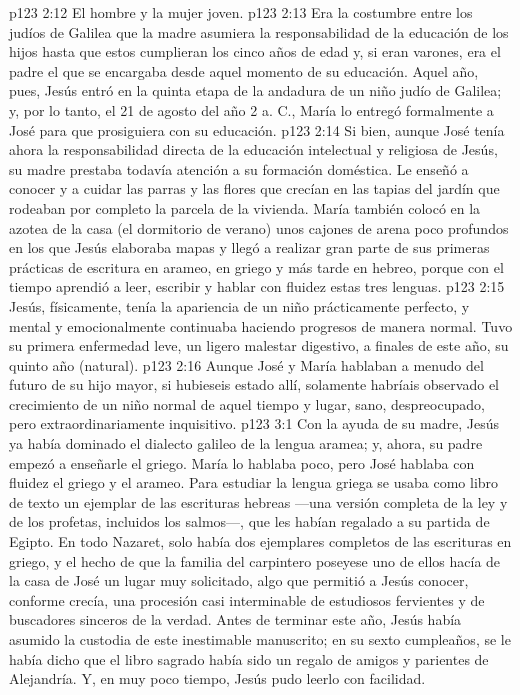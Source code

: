 \vs p123 2:12 El hombre y la mujer joven.
\vs p123 2:13 \pc Era la costumbre entre los judíos de Galilea que la madre asumiera la responsabilidad de la educación de los hijos hasta que estos cumplieran los cinco años de edad y, si eran varones, era el padre el que se encargaba desde aquel momento de su educación. Aquel año, pues, Jesús entró en la quinta etapa de la andadura de un niño judío de Galilea; y, por lo tanto, el 21 de agosto del año 2 a. C., María lo entregó formalmente a José para que prosiguiera con su educación.
\vs p123 2:14 Si bien, aunque José tenía ahora la responsabilidad directa de la educación intelectual y religiosa de Jesús, su madre prestaba todavía atención a su formación doméstica. Le enseñó a conocer y a cuidar las parras y las flores que crecían en las tapias del jardín que rodeaban por completo la parcela de la vivienda. María también colocó en la azotea de la casa (el dormitorio de verano) unos cajones de arena poco profundos en los que Jesús elaboraba mapas y llegó a realizar gran parte de sus primeras prácticas de escritura en arameo, en griego y más tarde en hebreo, porque con el tiempo aprendió a leer, escribir y hablar con fluidez estas tres lenguas.
\vs p123 2:15 Jesús, físicamente, tenía la apariencia de un niño prácticamente perfecto, y mental y emocionalmente continuaba haciendo progresos de manera normal. Tuvo su primera enfermedad leve, un ligero malestar digestivo, a finales de este año, su quinto año (natural).
\vs p123 2:16 Aunque José y María hablaban a menudo del futuro de su hijo mayor, si hubieseis estado allí, solamente habríais observado el crecimiento de un niño normal de aquel tiempo y lugar, sano, despreocupado, pero extraordinariamente inquisitivo.
\vs p123 3:1 Con la ayuda de su madre, Jesús ya había dominado el dialecto galileo de la lengua aramea; y, ahora, su padre empezó a enseñarle el griego. María lo hablaba poco, pero José hablaba con fluidez el griego y el arameo. Para estudiar la lengua griega se usaba como libro de texto un ejemplar de las escrituras hebreas ---una versión completa de la ley y de los profetas, incluidos los salmos---, que les habían regalado a su partida de Egipto. En todo Nazaret, solo había dos ejemplares completos de las escrituras en griego, y el hecho de que la familia del carpintero poseyese uno de ellos hacía de la casa de José un lugar muy solicitado, algo que permitió a Jesús conocer, conforme crecía, una procesión casi interminable de estudiosos fervientes y de buscadores sinceros de la verdad. Antes de terminar este año, Jesús había asumido la custodia de este inestimable manuscrito; en su sexto cumpleaños, se le había dicho que el libro sagrado había sido un regalo de amigos y parientes de Alejandría. Y, en muy poco tiempo, Jesús pudo leerlo con facilidad.
